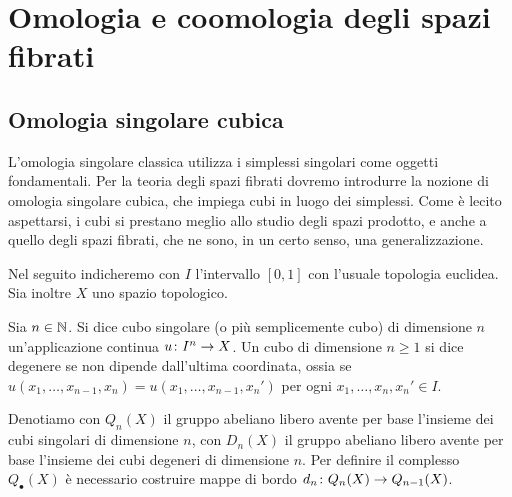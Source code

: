 \chapter{Omologia e coomologia degli spazi fibrati}
\label{chapter-fibration}

\section{Omologia singolare cubica}

L'omologia singolare classica utilizza i simplessi singolari come oggetti fondamentali. Per la teoria degli spazi fibrati dovremo introdurre la nozione di omologia singolare cubica, che impiega cubi in luogo dei simplessi. Come è lecito aspettarsi, i cubi si prestano meglio allo studio degli spazi prodotto, e anche a quello degli spazi fibrati, che ne sono, in un certo senso, una generalizzazione.

Nel seguito indicheremo con $I$ l'intervallo $[0,1]$ con l'usuale topologia euclidea. Sia inoltre $X$ uno spazio topologico.

\begin{definition}
Sia $n\in\mathbb{N}$. Si dice cubo singolare (o più semplicemente cubo) di dimensione $n$ un'applicazione continua $u\colon I^n\to X$. Un cubo di dimensione $n\ge 1$ si dice degenere se non dipende dall'ultima coordinata, ossia se $u(x_1,\ldots,x_{n-1},x_n)=u(x_1,\ldots,x_{n-1},x_n')$ per ogni $x_1,\ldots,x_n,x_n'\in I$.
\end{definition}

Denotiamo con $Q_n(X)$ il gruppo abeliano libero avente per base l'insieme dei cubi singolari di dimensione $n$, con $D_n(X)$ il gruppo abeliano libero avente per base l'insieme dei cubi degeneri di dimensione $n$. Per definire il complesso $Q_\bullet(X)$ è necessario costruire mappe di bordo $d_n\colon Q_n(X)\to Q_{n-1}(X)$.

